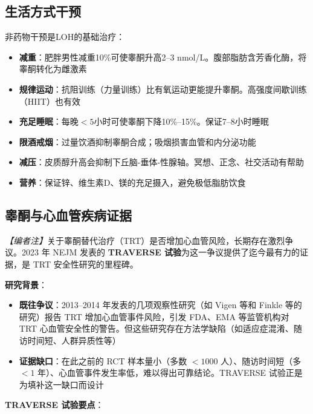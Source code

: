 \documentclass[12pt,a4paper,twoside]{ctexbook}
\begin{document}
\subsection{生活方式干预}

非药物干预是LOH的基础治疗：

\begin{itemize}[leftmargin=2cm]
	\item \textbf{减重}：肥胖男性减重10\%可使睾酮升高2--3 nmol/L。腹部脂肪含芳香化酶，将睾酮转化为雌激素
	\item \textbf{规律运动}：抗阻训练（力量训练）比有氧运动更能提升睾酮。高强度间歇训练（HIIT）也有效
	\item \textbf{充足睡眠}：每晚$<5$小时可使睾酮下降10\%--15\%。保证7--8小时睡眠
	\item \textbf{限酒戒烟}：过量饮酒抑制睾酮合成；吸烟损害血管和内分泌功能
	\item \textbf{减压}：皮质醇升高会抑制下丘脑-垂体-性腺轴。冥想、正念、社交活动有帮助
	\item \textbf{营养}：保证锌、维生素D、镁的充足摄入，避免极低脂肪饮食
\end{itemize}

\subsection{睾酮与心血管疾病证据}
\label{subsec:traverse_trial}

\noindent\textit{【编者注】}关于睾酮替代治疗（TRT）是否增加心血管风险，长期存在激烈争议。2023 年 NEJM 发表的 \textbf{TRAVERSE 试验}为这一争议提供了迄今最有力的证据，是 TRT 安全性研究的里程碑。

\vspace{0.5em}
\noindent\textbf{研究背景}：

\begin{itemize}[leftmargin=2cm]
	\item \textbf{既往争议}：2013--2014 年发表的几项观察性研究（如 Vigen 等和 Finkle 等的研究）报告 TRT 增加心血管事件风险，引发 FDA、EMA 等监管机构对 TRT 心血管安全性的警告。但这些研究存在方法学缺陷（如适应症混淆、随访时间短、人群异质性等）
	\item \textbf{证据缺口}：在此之前的 RCT 样本量小（多数 $<1000$ 人）、随访时间短（多 $<1$ 年）、心血管事件发生率低，难以得出可靠结论。TRAVERSE 试验正是为填补这一缺口而设计
\end{itemize}

\vspace{0.5em}
\noindent\textbf{TRAVERSE 试验要点}：
\end{document}
